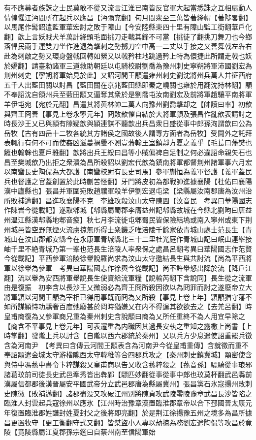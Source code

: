 有不應募者族誅之士民莫敢不從又流言江淮已南皆反官軍大起當悉誅之互相扇動人情惶懼江沔間所在起兵以應昌【沔彌兖翻】旬月間衆至三萬皆著絳㡌【著陟畧翻】以馬尾作髯詔遣監軍華宏討之敗于障山【今安陸縣東四十里有障山監工銜翻華戶化翻】歆上言妖賊犬羊萬計絳頭毛面挑刀走戟其鋒不可當【挑徒了翻挑刀舞刀也今鄉落悍民兩手運雙刀坐作進退為擊刺之勢擲刀空中高一二丈以手接之又善舞戟左犇右赴為刺敵之勢又環身盤戟回轉如縈又以戟矜柱地跳過矜上特為儇捷此所謂走戟也妖於嬌翻】請臺勑諸軍三道救助朝廷以屯騎校尉劉喬為豫州刺史寧朔將軍沛國劉宏為荆州刺史【寧朔將軍始見於此】又詔河間王顒遣雍州刺史劉沈將州兵萬人并征西府五千人出藍田關以討昌【藍田關在京兆藍田縣即秦之嶢關也雍於用翻沈持林翻】顒不奉詔沈自領州兵至藍田顒又逼奪其衆於是劉喬屯汝南劉宏及前將軍趙驤平南將軍羊伊屯宛【宛於元翻】昌遣其將黄林帥二萬人向豫州劉喬擊却之【帥讀曰率】初歆與齊王冏善【事見上卷永寧元年】冏敗歆懼自結於大將軍頴及張昌作亂歆表請討之時長沙王乂已與頴有隙疑歆與頴連謀不聽歆出兵昌衆日盛從事中郎孫洵謂歆曰公為岳牧【古有四岳十二牧各統其方諸侯之國故後人謂專方面者為岳牧】受閫外之託拜表輒行有何不可而使姦凶滋蔓禍釁不測豈藩翰王室鎮靜方夏之義乎【毛萇曰藩樊也籬也翰榦也夏戶雅翻】歆將出兵王綏曰昌等小賊偏禆自足制之何必違詔命親矢石也昌至樊城歆乃出拒之衆潰為昌所殺詔以劉宏代歆為鎮南將軍都督荆州諸軍事六月宏以南蠻長史陶侃為大都護【南蠻校尉有長史司馬】參軍蒯恒為義軍督護【義軍蓋民兵也督護之官蓋創置於此時蒯苦怪翻】牙門將皮初為都戰帥進據襄陽【杜佑曰襄陽漢中廬縣也】張昌并軍圍宛敗趙驤軍殺羊伊劉宏退屯梁【梁縣屬汝南郡唐為汝州治所敗補邁翻】昌進攻襄陽不克　李雄攻殺汶山太守陳圖【汶音民　考異曰華陽國志作陳旹今從載記】遂取郫城【郫縣屬蜀郡李膺益州記郫縣故城在今縣北劉昫曰唐益州温江縣漢郫縣地郫音疲】秋七月李流徙屯郫蜀民皆保險結塢或南入寧州或東下荆州城邑皆空野無煙火流虜掠無所得士衆饑乏唯涪陵千餘家依青城山處士范長生【青城山在汶山郡都安縣今在永康軍青城縣北三十二里杜光庭作青城山記曰岷山連峯接岫千里不絶青城乃第一峯也范長生涪陵人率衆保之處昌呂翻考異曰華陽國志作范賢今從載記】平西參軍涪陵徐轝說羅尚求為汶山太守邀結長生與共討流【尚為平西將軍以徐轝為參軍　考異曰華陽國志作徐輿今從載記】尚不許轝怒出降於流【降戶江翻】流以轝為安西將軍轝說長生使資給流軍糧【說輸芮翻下含說同】長生從之流軍由是復振　初李含以長沙王乂微弱必為齊王冏所殺因欲以為冏罪而討之遂廢帝立大將軍頴以河間王顒為宰相已得用事既而冏為乂所殺【事見上卷上年】頴顒猶守藩不如所謀頴恃功驕奢百度弛廢甚於冏時猶嫌乂在内不得逞其欲欲去之【去羌呂翻】時皇甫商復為乂參軍商兄重為秦州刺史含說顒曰商為乂所任重終不為人用宜早除之【商含不平事見上卷元年】可表遷重為内職因其過長安執之重知之露檄上尚書【上時掌翻】發隴上兵以討含【自隴以西六郡統於秦州】乂以兵方少息遣使詔重罷兵徵含為河南尹　【考異曰含傳云河間王顒表含為河南尹今從皇甫重傳】含就徵而重不奉詔顒遣金城太守游楷隴西太守韓稚等合四郡兵攻之【秦州刺史鎮冀城】顒密使含與侍中馮蓀中書令卞粹謀殺乂皇甫商以告乂收含蓀粹殺之【蓀音孫】驃騎從事琅邪諸葛玟前司徒長史武邑牽秀皆出犇鄴【驃匹妙翻從事從事中郎也玟莫杯翻武邑縣前漢屬信都郡後漢晉屬安平國武帝分立武邑郡唐為縣屬冀州】張昌黨石氷寇揚州敗刺史陳徽【敗補邁翻】諸郡盡没又攻破江州别將陳貞攻武陵零陵豫章武昌長沙皆陷之臨淮人封雲起兵寇徐州以應氷【江州時治豫章漢置臨淮郡章帝以合下邳國晉太康元年復置臨淮郡姓譜封姓夏封父之後將即亮翻】於是荆江徐揚豫五州之境多為昌所據昌更置牧守【更工衡翻守式又翻】皆桀盜小人專以劫掠為務劉宏遣陶侃等攻昌於竟陵【竟陵縣屬江夏郡孫宗鑑曰自蔡州南至信陽軍始